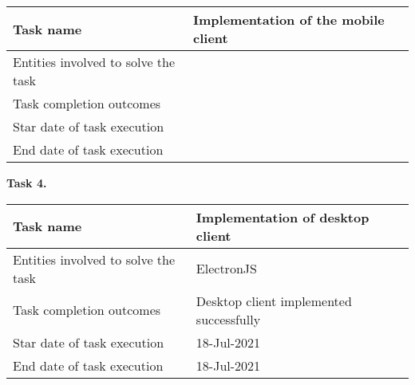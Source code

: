 \begin{description}
\begin{tabular}{|p{}|p{}|}
        \hline
        Task name                           & Implementation of the mobile client \\
        \hline
        Entities involved to solve the task &                                     \\
        \hline
        Task completion outcomes            &                                     \\
        \hline
        Star date of task execution         &                                     \\
        \hline
        End date of task execution          &                                     \\
        \hline
    \end{tabular}
    \item \hspace*{8mm}\textbf{Task 4.}\\
    \begin{tabular}{|p{}|p{}|}
        \hline
        Task name                           & Implementation of desktop client        \\
        \hline
        Entities involved to solve the task & ElectronJS                              \\
        \hline
        Task completion outcomes            & Desktop client implemented successfully \\
        \hline
        Star date of task execution         & 18-Jul-2021                             \\
        \hline
        End date of task execution          & 18-Jul-2021                             \\
        \hline
    \end{tabular}
\end{description}